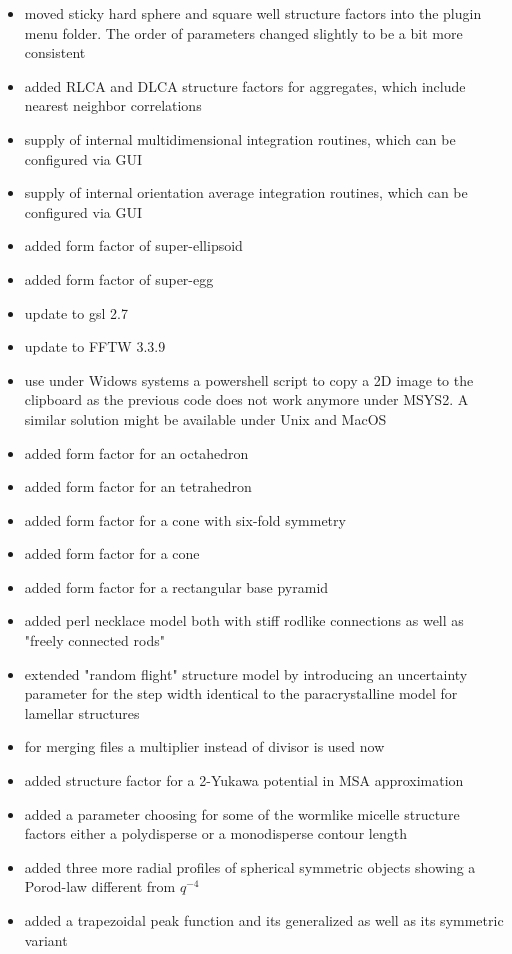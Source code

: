 \begin{description}
\begin{itemize}
    \item moved sticky hard sphere and square well structure factors into the plugin menu folder.
            The order of parameters changed slightly to be a bit more consistent
    \item added RLCA and DLCA structure factors for aggregates, which include nearest neighbor correlations
    \item supply of internal multidimensional integration routines, which can be configured via GUI
    \item supply of internal orientation average integration routines, which can be configured via GUI
    \item added form factor of super-ellipsoid
    \item added form factor of super-egg
    \item update to gsl 2.7
    \item update to FFTW 3.3.9
    \item use under Widows systems a powershell script to copy a 2D image to the clipboard as the previous code does not work anymore under MSYS2. A similar solution might be available under Unix and MacOS
    \item added form factor for an octahedron
    \item added form factor for an tetrahedron
    \item added form factor for a cone with six-fold symmetry
    \item added form factor for a cone
    \item added form factor for a rectangular base pyramid
    \item added perl necklace model both with stiff rodlike connections as well as "freely connected rods"
    \item extended "random flight" structure model by introducing an uncertainty parameter for the step width identical to the paracrystalline model for lamellar structures
    \item for merging files a multiplier instead of divisor is used now
    \item added structure factor for a 2-Yukawa potential in MSA approximation
    \item added a parameter choosing for some of the wormlike micelle structure factors either a polydisperse or a monodisperse contour length
    \item added three more radial profiles of spherical symmetric objects showing a Porod-law different from $q^{-4}$
    \item added a trapezoidal peak function and its generalized as well as its symmetric variant

\end{itemize}
\end{description}
